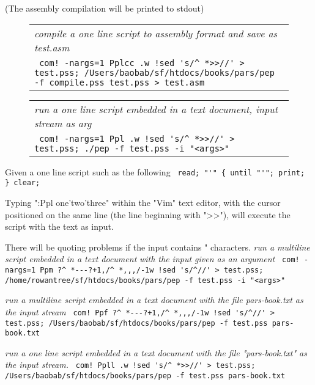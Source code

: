 \documentclass[a4paper,12pt]{article}
\begin{document}
  (The assembly compilation will be printed to stdout)
 \begin{figure}
 \begin{tabular}{ l }
 \emph{ compile a one line script to assembly format and save as test.asm  } \\ 
 \verb| com! -nargs=1 Pplcc .w !sed 's/^ *>>//' > test.pss; /Users/baobab/sf/htdocs/books/pars/pep -f compile.pss test.pss > test.asm |
 \end{tabular} 
 \end{figure}
 \begin{figure}
 \begin{tabular}{ l }
 \emph{ run a one line script embedded in a text document, input stream as arg } \\ 
 \verb| com! -nargs=1 Ppl .w !sed 's/^ *>>//' > test.pss; ./pep -f test.pss -i "<args>" |
 \end{tabular} 
 \end{figure}

  Given a one line script such as the following 
 \verb| read; "'" { until "'"; print; } clear; |


  Typing ":Ppl one'two'three" within the "Vim" text editor, with the cursor
  positioned on the same line (the line beginning with ">>"), will execute the
  script with the text as input.

 There will be quoting problems if the input contains " characters.
 \emph{ run a multiline script embedded in a text document }
 \emph{ with the input given as an argument  } 
 \verb| com! -nargs=1 Ppm ?^ *---?+1,/^ *,,,/-1w !sed 's/^//' > test.pss; /home/rowantree/sf/htdocs/books/pars/pep -f test.pss -i "<args>"  |

 \emph{ run a multiline script embedded in a text document }
 \emph{ with the file pars-book.txt as the input stream } 
 \verb| com! Ppf ?^ *---?+1,/^ *,,,/-1w !sed 's/^//' > test.pss; /Users/baobab/sf/htdocs/books/pars/pep -f test.pss pars-book.txt |

 \emph{ run a one line script embedded in a text document }
 \emph{ with the file "pars-book.txt" as the input stream.  } 
 \verb| com! Ppll .w !sed 's/^ *>>//' > test.pss; /Users/baobab/sf/htdocs/books/pars/pep -f test.pss pars-book.txt  |
\end{document}
